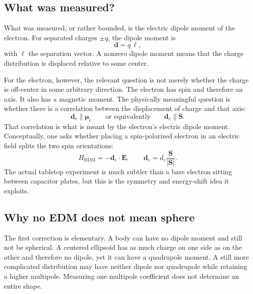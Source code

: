 \subsection{What was measured?}

What was measured, or rather bounded, is the electric dipole moment of the electron. For separated charges \(\pm q\), the dipole moment is
\begin{equation}
\mathbf d = q\,\boldsymbol{\ell},
\end{equation}
with \(\boldsymbol{\ell}\) the separation vector. A nonzero dipole moment means that the charge distribution is displaced relative to some center.

For the electron, however, the relevant question is not merely whether the charge is off-center in some arbitrary direction. The electron has spin and therefore an axis. It also has a magnetic moment. The physically meaningful question is whether there is a correlation between the displacement of charge and that axis:
\begin{equation}
\mathbf d_e \parallel \boldsymbol{\mu}_e
\qquad \text{or equivalently} \qquad
\mathbf d_e \parallel \mathbf S .
\end{equation}
That correlation is what is meant by the electron's electric dipole moment. Conceptually, one asks whether placing a spin-polarized electron in an electric field splits the two spin orientations:
\begin{equation}
H_{\mathrm{EDM}}=-\mathbf d_e\cdot \mathbf E,
\qquad
\mathbf d_e=d_e\frac{\mathbf S}{|\mathbf S|}.
\end{equation}
The actual tabletop experiment is much subtler than a bare electron sitting between capacitor plates, but this is the symmetry and energy-shift idea it exploits.

\subsection{Why no EDM does not mean sphere}

The first correction is elementary. A body can have no dipole moment and still not be spherical. A centered ellipsoid has as much charge on one side as on the other and therefore no dipole, yet it can have a quadrupole moment. A still more complicated distribution may have neither dipole nor quadrupole while retaining a higher multipole. Measuring one multipole coefficient does not determine an entire shape.


